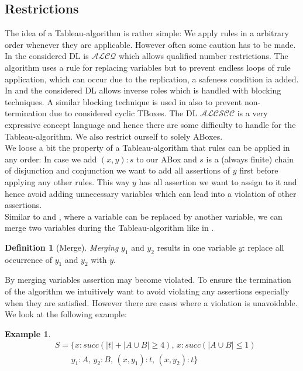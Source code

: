 \documentclass[a4paper,11pt]{scrartcl}
\theoremstyle{break}
\theoremstyle{definition}
\newtheorem{mydef}{Definition}
\newtheorem{ex}{Example}
\begin{document}
\subsection{Restrictions}\label{restriction}
The idea of a Tableau-algorithm is rather simple: We apply rules in a arbitrary order whenever they are applicable. However often some caution has to be made. In \cite{1} the considered DL is $\mathcal{ALCQ}$ which allows qualified number restrictions. The algorithm uses a rule for replacing variables but to prevent endless loops of rule application, which can occur due to the replication, a safeness condition ia added. In \cite{2} and\cite{6} the considered DL allows inverse roles which is handled with blocking techniques. A similar blocking technique is used in \cite{Ba} also to prevent non-termination due to considered cyclic TBoxes. The DL $\mathcal{ALCSCC}$ is a very expressive concept language and hence there are some difficulty to handle for the Tableau-algorithm. We also restrict ourself to solely ABoxes.\\
We loose a bit the property of a Tableau-algorithm that rules can be applied in any order: In case we add $(x,y):s$ to our ABox and $s$ is a (always finite) chain of disjunction and conjunction we want to add all assertions of $y$ first before applying any other rules. This way $y$ has all assertion we want to assign to it and hence avoid adding unnecessary variables which can lead into a violation of other assertions.\\
Similar to \cite{1} and \cite{6}, where a variable can be replaced by another variable, we can merge two variables during the Tableau-algorithm like in \cite{2}.
\begin{mydef}[Merge]
\textit{Merging} $y_1$ and $y_2$ results in one variable $y$: replace all occurrence of $y_1$ and $y_2$ with $y$. 
\end{mydef}
By merging variables assertion may become violated. To ensure the termination of the algorithm we intuitively want to avoid violating any assertions especially when they are satisfied. However there are cases where a violation is unavoidable. We look at the following example:
\begin{ex}
\begin{align*}
&S=\{x:succ(|t|+|A\cup B|\geq 4),\,x:succ(|A\cup B|\leq 1)\\
&\quad\quad y_1:A,\,y_2:B,\,(x,y_1):t,\,(x,y_2):t\}
\end{align*}
\end{ex}
\end{document}
